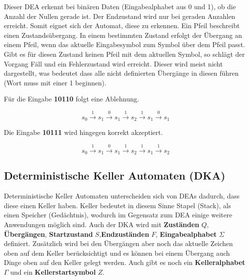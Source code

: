 Dieser DEA erkennt bei binären Daten (Eingabealphabet aus 0 und 1), ob die Anzahl
der Nullen gerade ist. Der Endzustand wird nur bei geraden Anzahlen erreicht.
Somit eignet sich der Automat, diese zu erkennen.
Ein Pfeil beschreibt einen Zustandsübergang. In einem bestimmten Zustand erfolgt
der Übergang an einem Pfeil, wenn das aktuelle Eingabesymbol zum Symbol über dem Pfeil passt.
Gibt es für diesen Zustand keinen Pfeil mit dem aktuellen Symbol, so schlägt der Vorgang
Fäll und ein Fehlerzustand wird erreicht. Dieser wird meist nicht dargestellt, was bedeutet
dass alle nicht definierten Übergänge in diesen führen (Wort muss mit einer 1 beginnen).

\clearpage

Für die Eingabe \textbf{10110} folgt eine Ablehnung.

\Large
\begin{equation*}
    s_0 \overset{1}{\rightarrow} s_1 \overset{0}{\rightarrow} s_1 \overset{1}{\rightarrow}
    s_2 \overset{1}{\rightarrow} s_1 \overset{0}{\rightarrow} s_1 
\end{equation*}
\normalsize

Die Eingabe \textbf{10111} wird hingegen korrekt akzeptiert.

\vspace*{-0.9cm}

\Large
\begin{equation*}
    s_0 \overset{1}{\rightarrow} s_1 \overset{0}{\rightarrow} s_1 \overset{1}{\rightarrow}
    s_2 \overset{1}{\rightarrow} s_1 \overset{1}{\rightarrow} s_2 
\end{equation*}
\normalsize

\clearpage

\subsection{Deterministische Keller Automaten (DKA)}

Deterministische Keller Automaten unterscheiden sich von DEAs dadurch,
dass diese einen Keller haben. Keller bedeutet in diesem Sinne Stapel (Stack),
als einen Speicher (Gedächtnis), wodurch im Gegensatz zum DEA einige
weitere Anwendungen möglich sind.
Auch der DKA wird mit \textbf{Zuständen} $Q$, \textbf{Übergängen},
\textbf{Startzustand} $S$,\textbf{Endzuständen} $F$, \textbf{Eingabealphabet} $\Sigma$
definiert. Zusätzlich wird bei den Übergängen aber noch das aktuelle Zeichen oben auf
dem Keller berücksichtigt und es können bei einem Übergang auch Dinge oben auf den Keller
gelegt werden. Auch gibt es noch ein \textbf{Kelleralphabet} $\Gamma$ und ein
\textbf{Kellerstartsymbol} $Z$.


